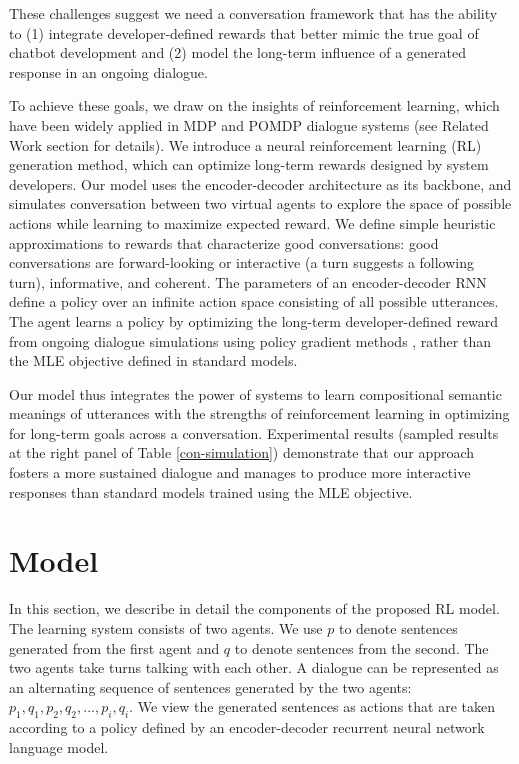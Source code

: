 These challenges suggest we need a conversation framework that has the ability to (1)  integrate developer-defined rewards that better mimic the true goal of chatbot development
  and (2)  model the long-term influence of a generated response in an ongoing dialogue.

To achieve these goals,  we draw on the insights of reinforcement learning, which
have been widely applied in MDP and POMDP dialogue systems (see Related Work section for details).
We introduce a neural reinforcement learning (RL) generation method, 
which can optimize long-term rewards designed by system developers.
Our model uses the encoder-decoder architecture as its backbone, and 
 simulates conversation between two virtual agents to explore the space of possible actions while learning to maximize expected reward.
We define simple heuristic approximations to rewards that characterize
 good conversations: good conversations are forward-looking \cite{All92} or interactive (a turn suggests
 a following turn), informative, and coherent.
  The parameters of an encoder-decoder RNN define a policy over an infinite action space consisting of all possible utterances.
  The agent learns a policy by optimizing the long-term developer-defined reward from ongoing dialogue simulations using policy gradient methods \cite{williams1992simple},
  rather than the MLE objective defined in standard \sts models. 

Our model thus integrates the power of \sts systems to learn compositional semantic
meanings of utterances with the strengths of reinforcement learning in
optimizing for long-term goals across a conversation.
 Experimental results (sampled results at the right panel of Table \ref{con-simulation}) demonstrate that our approach fosters a more sustained dialogue and
  manages to produce more interactive  responses than standard \sts models trained using the MLE objective.
\section{Model}  
  In this section, we describe in detail the components of the proposed RL model. 
The learning system consists of two agents. 
We use $p$ to denote sentences generated from the first agent and  $q$ to denote sentences from the second. The two agents take turns talking with each other. A dialogue can be represented as an alternating sequence of sentences generated by the two agents: $p_1, q_1, p_2, q_2, ..., p_{i}, q_{i}$.  We view the generated sentences as actions that are taken according to a policy defined by an
encoder-decoder recurrent neural network language model.

